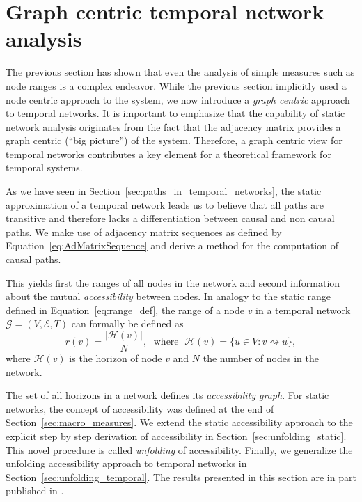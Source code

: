 \section{Graph centric temporal network analysis}\label{sec:PRL}
The previous section has shown that even the analysis of simple measures such as node ranges is a complex endeavor.
While the previous section implicitly used a node centric approach to the system, we now introduce a \emph{graph centric} approach to temporal networks.
It is important to emphasize that the capability of static network analysis originates from the fact that the adjacency matrix provides a graph centric (``big picture'') of the system.
Therefore, a graph centric view for temporal networks contributes a key element for a theoretical framework for temporal systems.

As we have seen in Section~\ref{sec:paths_in_temporal_networks}, the static approximation of a temporal network leads us to believe that all paths are transitive and therefore lacks a differentiation between causal and non causal paths.
We make use of adjacency matrix sequences as defined by Equation~\eqref{eq:AdMatrixSequence} and derive a method for the computation of causal paths.

This yields first the ranges of all nodes in the network and second information about the mutual \emph{accessibility} between nodes.
In analogy to the static range defined in Equation~\eqref{eq:range_def}, the range of a node $v$ in a temporal network $\mathcal{G}=(V,\mathcal{E},T)$ can formally be defined as
\begin{equation}\label{eq:temporal_range_def}
r(v)=\frac{\left| \mathcal{H}(v) \right| }{N}, \; \text{ where } \; \mathcal{H}(v)=\{u \in V: v\rightsquigarrow u \},
\end{equation}
where $\mathcal{H}(v)$ is the horizon of node $v$ and $N$ the number of nodes in the network.

The set of all horizons in a network defines its \emph{accessibility graph}.
For static networks, the concept of accessibility was defined at the end of Section~\ref{sec:macro_measures}.
We extend the static accessibility approach to the explicit step by step derivation of accessibility in Section~\ref{sec:unfolding_static}.
This novel procedure is called \emph{unfolding} of accessibility.
Finally, we generalize the unfolding accessibility approach to temporal networks in Section~\ref{sec:unfolding_temporal}.
The results presented in this section are in part published in \citep{Lentz:2013PRL}.

